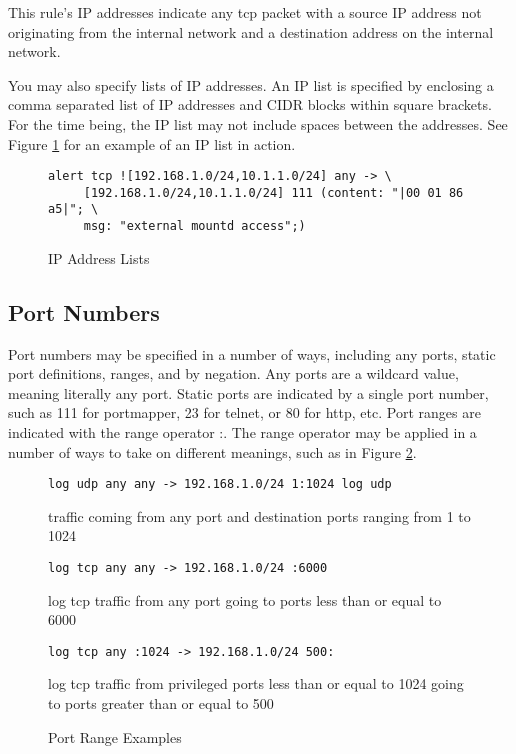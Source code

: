 \documentclass[english]{report}
\begin{document}
This rule's IP addresses indicate any tcp packet with a
source IP address not originating from the internal network and a
destination address on the internal network.

You may also specify lists of IP addresses. An IP list is specified
by enclosing a comma separated list of IP addresses and CIDR blocks
within square brackets. For the time being, the IP list may not include
spaces between the addresses. See Figure \ref{IP list usage} for
an example of an IP list in action.

\begin{center}
\begin{figure}[!hbpt]
\begin{verbatim}
alert tcp ![192.168.1.0/24,10.1.1.0/24] any -> \
     [192.168.1.0/24,10.1.1.0/24] 111 (content: "|00 01 86 a5|"; \
     msg: "external mountd access";)
\end{verbatim}

\caption{\label{IP list usage}IP Address Lists}
\end{figure}
\end{center}



\subsection{Port Numbers}

Port numbers may be specified in a number of ways, including any
ports, static port definitions, ranges, and by negation. Any
ports are a wildcard value, meaning literally any port. Static ports
are indicated by a single port number, such as 111 for portmapper,
23 for telnet, or 80 for http, etc. Port ranges are indicated with
the range operator :. The range operator may be
applied in a number of ways to take on different meanings, such as
in Figure \ref{port range examples}.

\begin{center}
\begin{figure}[!hbpt]
\begin{verbatim}
log udp any any -> 192.168.1.0/24 1:1024 log udp 
\end{verbatim}
traffic coming from any port and destination ports ranging from 1
to 1024

\begin{verbatim}
log tcp any any -> 192.168.1.0/24 :6000 
\end{verbatim}
log tcp traffic from any port going to ports less than or equal to
6000

\begin{verbatim}
log tcp any :1024 -> 192.168.1.0/24 500: 
\end{verbatim}
log tcp traffic from privileged ports less than or equal to 1024 going
to ports greater than or equal to 500


\caption{\label{port range examples}Port Range Examples}
\end{figure}
\end{center}
\end{document}
